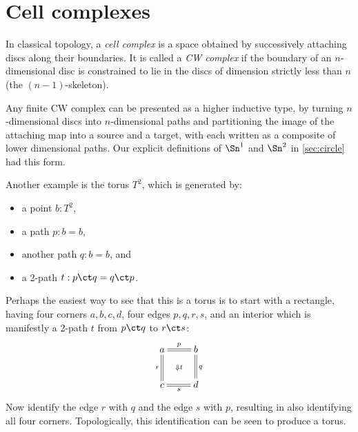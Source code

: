 %

\section{Cell complexes}
\label{sec:cell-complexes}

%
%
In classical topology, a \emph{cell complex} is a space obtained by successively attaching discs along their boundaries.
It is called a \emph{CW complex} if the boundary of an $n$-dimensional disc is constrained to lie in the discs of dimension strictly less than $n$ (the $(n-1)$-skeleton).

Any finite CW complex can be presented as a higher inductive type, by turning $n$-dimensional discs into $n$-dimensional paths and partitioning the image of the attaching map into a source and a target, with each written as a composite of lower dimensional paths.
Our explicit definitions of $\Sn^1$ and $\Sn^2$ in \cref{sec:circle} had this form.

%
Another example is the torus $T^2$, which is generated by:
\begin{itemize}
\item a point $b:T^2$,
\item a path $p:b=b$,
\item another path $q:b=b$, and
\item a 2-path $t: p\ct q = q \ct p$.
\end{itemize}
Perhaps the easiest way to see that this is a torus is to start with a rectangle, having four corners $a,b,c,d$, four edges $p,q,r,s$, and an interior which is manifestly a 2-path $t$ from $p\ct q$ to $r\ct s$:
\begin{equation*}
  \xymatrix{
      a\ar@{=}[r]^p\ar@{=}[d]_r \ar@{}[dr]|{\Downarrow t} &
      b\ar@{=}[d]^q\\
      c\ar@{=}[r]_s &
      d
      }
\end{equation*}
Now identify the edge $r$ with $q$ and the edge $s$ with $p$, resulting in also identifying all four corners.
Topologically, this identification can be seen to produce a torus.

